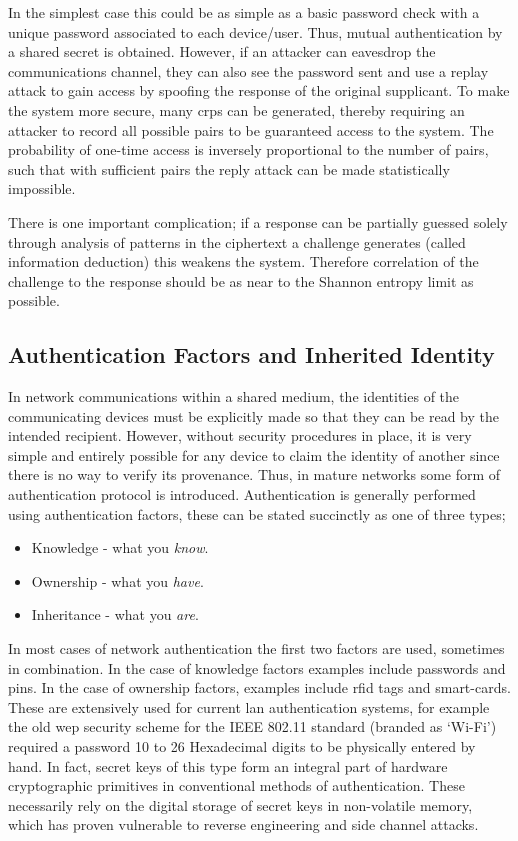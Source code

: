 In the simplest case this could be as simple as a basic password check with a
unique password associated to each device/user. Thus, mutual authentication by a
shared secret is obtained.
However, if an attacker
can eavesdrop the communications channel, they can also see the password sent and
use a replay attack to gain access by spoofing the response of the original
supplicant. To make the system more secure, many \glspl{crp} can
be generated, thereby requiring an attacker to record all possible pairs to be
guaranteed access to the system. The probability of one-time access is
inversely proportional to the number of pairs, such that with sufficient pairs
the reply attack can be made statistically impossible.

There is one important complication; if a response can be
partially guessed solely through analysis of patterns in the ciphertext a
challenge generates (called information deduction) this weakens the system.
Therefore correlation of the challenge to the response should
be as near to the Shannon entropy limit as possible.

\subsection{Authentication Factors and Inherited Identity}

In network communications within a shared medium, the identities of the communicating devices
must be explicitly made so that they can be read by the intended recipient.
However, without security procedures in place, it is very simple and entirely
possible for any device
to claim the identity of another since there is no way to verify its provenance.
Thus, in mature networks some form of authentication protocol is introduced.
Authentication is generally performed using authentication factors, these can be stated
succinctly as one of three types;

\begin{itemize}
\item Knowledge - what you \emph{know}.
\item Ownership - what you \emph{have}.
\item Inheritance - what you \emph{are}.
\end{itemize}

In most cases of network authentication the first two factors are used, sometimes in combination.
In the case of knowledge factors examples include passwords and \glspl{pin}. In the case of
ownership factors, examples include \gls{rfid} tags and smart-cards.
These are extensively used for
current \gls{lan} authentication systems, for example the old \gls{wep} security scheme for the
IEEE 802.11 standard (branded as `Wi-Fi') required a password 10 to 26 Hexadecimal digits to
be physically entered by hand. In fact, secret keys of this type form an
integral part of hardware cryptographic primitives in conventional methods of authentication.
These necessarily rely on the digital storage of secret keys in non-volatile memory,
which has proven vulnerable to reverse engineering and side channel attacks.


